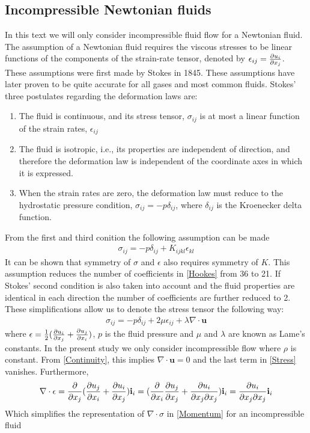 \subsection{Incompressible Newtonian fluids}
In this text we will only consider incompressible fluid flow for a Newtonian fluid. 
The assumption of a Newtonian fluid requires the viscous stresses to be linear functions of the components of the strain-rate tensor, denoted by $\epsilon_{ij} = \frac{\partial u_i}{\partial x_j}$. These assumptions were first made by Stokes in 1845. These assumptions have later proven to be quite accurate for all gases and most common fluids. Stokes' three postulates regarding the deformation laws are: \cite{White}
\begin{enumerate}
\item The fluid is continuous, and its stress tensor, $\sigma_{ij}$ is at most a linear function of the strain rates, $\epsilon_{ij}$ 
\item The fluid is isotropic, i.e., its properties are independent of direction, and therefore the deformation law is independent of the coordinate axes in which it is expressed. 
\item When the strain rates are zero, the deformation law must reduce to the hydrostatic pressure condition, $\sigma_{ij} = -p\delta_{ij}$, where $\delta_{ij}$ is the Kroenecker delta function. 
\end{enumerate}
From the first and third conition the following assumption can be made
\begin{align}
\sigma_{ij} = -p\delta_{ij} + K_{ijkl}\epsilon_{kl} \label{Hookes}
\end{align}
It can be shown that symmetry of $\sigma$ and $\epsilon$ also requires symmetry of $K$. This assumption reduces the number of coefficients in \ref{Hookes} from 36 to 21. If Stokes' second condition is also taken into account and the fluid properties are identical in each direction the number of coefficients are further reduced to 2. These simplifications allow us to denote the stress tensor the following way:
\begin{align}
\sigma_{ij} = -p\delta_{ij} + 2\mu\epsilon_{ij} + \lambda \nabla \cdot \mathbf{u} \label{Stress}
\end{align}
where $\epsilon = \frac{1}{2}(\frac{\partial u_i}{\partial x_j} + \frac{\partial u_j}{\partial x_i})$, $p$ is the fluid pressure and $\mu$ and $\lambda$ are known as Lame's constants. In the present study we only consider incompressible flow where $\rho$ is constant. From \ref{Continuity}, this implies $\nabla \cdot \mathbf{u} = 0$ and the last term in \ref{Stress} vanishes. Furthermore, 
\begin{align*}
\nabla \cdot \epsilon = \frac{\partial }{\partial x_j}(\frac{\partial u_j}{\partial x_i} + \frac{\partial u_i}{\partial x_j})\mathbf{i}_i = (\frac{\partial }{\partial x_i}\frac{\partial u_j}{\partial x_j} + \frac{\partial u_i}{\partial x_j \partial x_j})\mathbf{i}_i = \frac{\partial u_i}{\partial x_j \partial x_j} \mathbf{i}_i
\end{align*}
Which simplifies the representation of $\nabla \cdot \sigma$ in \ref{Momentum} for an incompressible fluid

